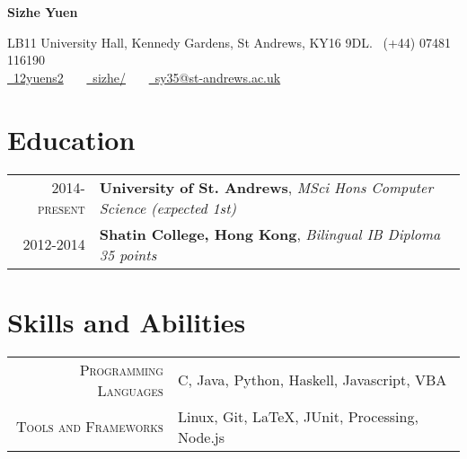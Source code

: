 \documentclass{article}
\begin{document}
\pagestyle{empty} %


\par{\centering
		{\Large \textbf{Sizhe Yuen}
	}\par}

\begin{center}
LB11 University Hall, Kennedy Gardens, St Andrews, KY16 9DL. \faMobile\ (+44) 07481 116190\\
\href{https://github.com/12yuens2}{\faGithub\ 12yuens2} \ \ \ \href{https://www.linkedin.com/in/sizhe/}{\faLinkedin\ sizhe/} \ \ \ \href{mailto:sy35@st-andrews.ac.uk}{\faEnvelopeO\ sy35@st-andrews.ac.uk}
\end{center}


\section*{Education}
\begin{tabular}{r|p{15cm}}
\textsc{2014-present} & \textbf{University of St. Andrews}, \textit{MSci Hons Computer Science (expected 1st)}
\\
\textsc{2012-2014} & \textbf{Shatin College, Hong Kong}, \textit{Bilingual IB Diploma 35 points}
\end{tabular}

\section*{Skills and Abilities}
\begin{tabular}{r|p{15cm}}
\textsc{Programming Languages} & C, Java, Python, Haskell, Javascript, VBA\\

\textsc{Tools and Frameworks} & Linux, Git, \LaTeX, JUnit, Processing, Node.js
\end{tabular}

\end{document}
